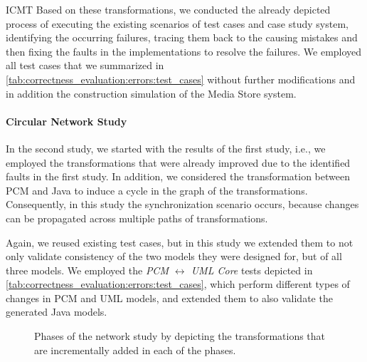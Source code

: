 \begin{copiedFrom}{ICMT}
Based on these transformations, we conducted the already depicted process of executing the existing scenarios of test cases and case study system, identifying the occurring failures, tracing them back to the causing mistakes and then fixing the faults in the implementations to resolve the failures.
We employed all test cases that we summarized in \autoref{tab:correctness_evaluation:errors:test_cases} without further modifications and in addition the construction simulation of the Media Store system.

\paragraph{Circular Network Study} 
In the second study, we started with the results of the first study, i.e., we employed the transformations that were already improved due to the identified faults in the first study.
In addition, we considered the transformation between \gls{PCM} and Java to induce a cycle in the graph of the transformations.
Consequently, in this study the synchronization scenario occurs, because changes can be propagated across multiple paths of transformations.

Again, we reused existing test cases, but in this study we extended them to not only validate consistency of the two models they were designed for, but of all three models.
We employed the \emph{PCM $\leftrightarrow$ UML Core} tests depicted in \autoref{tab:correctness_evaluation:errors:test_cases}, which perform different types of changes in \gls{PCM} and \gls{UML} models, and extended them to also validate the generated Java models.

\begin{figure}
    \centering
    
    \caption[Phases of second case study]{Phases of the network study by depicting the transformations that are incrementally added in each of the phases.}
    \label{fig:correctness_evaluation:errors:study_phases}
\end{figure}


\end{copiedFrom}

